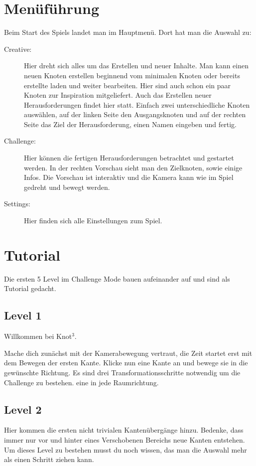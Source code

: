 \documentclass{scrartcl}
\begin{document}
\section*{Menüführung}
Beim Start des Spiels landet man im Hauptmenü. Dort hat man die Auswahl zu:
\begin{description}
\item[Creative:] Hier dreht sich alles um das Erstellen und neuer Inhalte. Man kann einen neuen Knoten erstellen beginnend vom minimalen Knoten oder bereits erstellte laden und weiter bearbeiten.
Hier sind auch schon ein paar Knoten zur Inspiration mitgeliefert. Auch das Erstellen neuer Herausforderungen findet hier statt. Einfach zwei unterschiedliche Knoten auswählen, auf der linken Seite den Ausgangsknoten und auf der rechten Seite das Ziel der Herausforderung, einen Namen eingeben und fertig.
\item[Challenge:] Hier können die fertigen Herausforderungen betrachtet und gestartet werden. In der rechten Vorschau sieht man den Zielknoten, sowie einige Infos. Die Vorschau ist interaktiv und die Kamera kann wie im Spiel gedreht und bewegt werden.
\item[Settings:] Hier finden sich alle Einstellungen zum Spiel.
\end{description}

\section*{Tutorial}

Die ersten 5 Level im Challenge Mode bauen aufeinander auf und sind als Tutorial gedacht.

\subsection*{Level 1}
Willkommen bei Knot$^3$.

Mache dich zunächst mit der Kamerabewegung vertraut, die Zeit startet erst mit dem Bewegen der ersten Kante. Klicke nun eine Kante an und bewege sie in die gewünschte Richtung. Es sind drei Transformationsschritte notwendig um die Challenge zu bestehen. eine in jede Raumrichtung.

\subsection*{Level 2}
Hier kommen die ersten nicht trivialen Kantenübergänge hinzu. Bedenke, dass immer nur vor und hinter eines Verschobenen Bereichs neue Kanten entstehen. Um dieses Level zu bestehen musst du noch wissen, das man die Auswahl mehr als einen Schritt ziehen kann.
\end{document}

